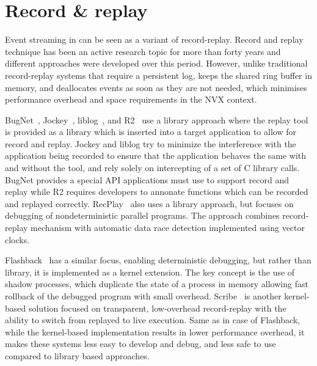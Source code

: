 \section{Record \& replay}
\label{related:record}

Event streaming in \varan can be seen as a variant of record-replay. Record and
replay technique has been an active research topic for more than forty years
and different approaches were developed over this period. However, unlike
traditional record-replay systems that require a persistent log, \varan keeps
the shared ring buffer in memory, and deallocates events as soon as they are
not needed, which minimises performance overhead and space requirements in the
NVX context.


BugNet~\cite{bugnet}, Jockey~\cite{jockey}, liblog~\cite{geels06}, and
R2~\cite{r2} use a library approach where the replay tool is provided as a
library which is inserted into a target application to allow for record and
replay. Jockey and liblog try to minimize the interference with the application
being recorded to ensure that the application behaves the same with and without
the tool, and rely solely on intercepting of a set of C library calls. BugNet
provides a special API applications must use to support record and replay while
R2 requires developers to annonate functions which can be recorded and replayed
correctly. RecPlay~\cite{recplay} also uses a library approach, but focuses on
debugging of nondeterministic parallel programs. The approach combines
record-replay mechanism with automatic data race detection implemented using
vector clocks.

Flashback~\cite{flashback} has a similar focus, enabling deterministic
debugging, but rather than library, it is implemented as a kernel extension.
The key concept is the use of shadow processes, which duplicate the state of a
process in memory allowing fast rollback of the debugged program with small
overhead. Scribe~\cite{scribe} is another kernel-based solution focused on
transparent, low-overhead record-replay with the ability to switch from
replayed to live execution. Same as in case of Flashback, while the
kernel-based implementation results in lower performance overhead, it makes
these systems less easy to develop and debug, and less safe to use compared to
library based approaches.

